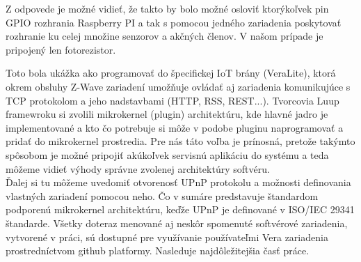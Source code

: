 Z odpovede je možné vidieť, že takto by bolo možné osloviť ktorýkoľvek pin GPIO rozhrania Raspberry PI a tak s pomocou jedného zariadenia poskytovať rozhranie ku celej množine senzorov a akčných členov. V našom prípade je pripojený len fotorezistor. 

\indent Toto bola ukážka ako programovať do špecifickej IoT brány (VeraLite), ktorá okrem obsluhy Z-Wave zariadení umožňuje ovládať aj zariadenia komunikujúce s TCP protokolom a jeho nadstavbami (HTTP, RSS, REST...). Tvorcovia Luup framewroku si zvolili mikrokernel (plugin) architektúru, kde hlavné jadro je implementované a kto čo potrebuje si môže v podobe pluginu naprogramovať a pridať do mikrokernel prostredia. Pre nás táto voľba je prínosná, pretože takýmto spôsobom je možné pripojiť akúkoľvek servisnú aplikáciu do systému a teda môžeme vidieť výhody správne zvolenej architektúry softvéru.\\
\indent Ďalej si tu môžeme uvedomiť otvorenosť UPnP protokolu a možnosti definovania vlastných zariadení pomocou neho. Čo v sumáre predstavuje štandardom podporenú mikrokernel architektúru, keďže UPnP je definované v ISO/IEC 29341 štandarde. Všetky doteraz menované aj neskôr spomenuté softvérové zariadenia, vytvorené v práci, sú dostupné pre využívanie používateľmi Vera zariadenia prostredníctvom github platformy. Nasleduje najdôležitejšia časť práce.


